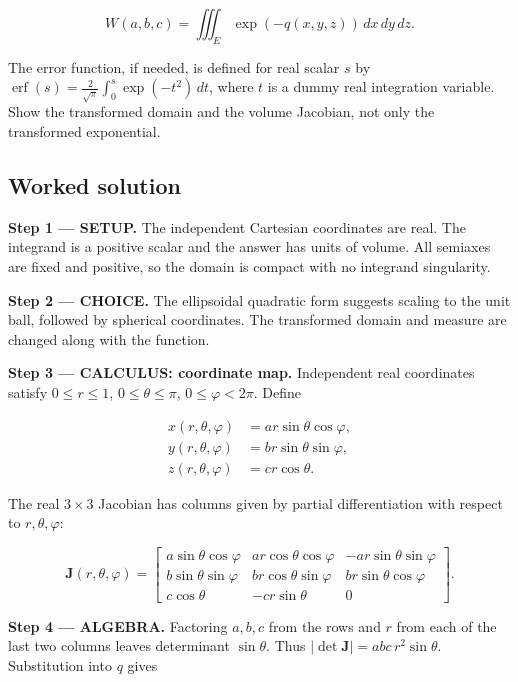 \documentclass[11pt,oneside,openany]{book}
\begin{document}
\[
W(a,b,c)=\iiint_E\exp(-q(x,y,z))\,dx\,dy\,dz.
\]

The error function, if needed, is defined for real scalar \(s\) by \(\operatorname{erf}(s)=\frac{2}{\sqrt\pi}\int_0^s\exp(-t^2)\,dt\), where \(t\) is a dummy real integration variable. Show the transformed domain and the volume Jacobian, not only the transformed exponential.
\subsection*{Worked solution}

\textbf{Step 1 --- SETUP.} The independent Cartesian coordinates are real. The integrand is a positive scalar and the answer has units of volume. All semiaxes are fixed and positive, so the domain is compact with no integrand singularity.

\begin{ChoiceStep}
\textbf{Step 2 --- CHOICE.} The ellipsoidal quadratic form suggests scaling to the unit ball, followed by spherical coordinates. The transformed domain and measure are changed along with the function.

\end{ChoiceStep}
\textbf{Step 3 --- CALCULUS: coordinate map.} Independent real coordinates satisfy \(0\le r\le1\), \(0\le\theta\le\pi\), \(0\le\varphi<2\pi\). Define

\[
\begin{aligned}
x(r,\theta,\varphi)&=ar\sin\theta\cos\varphi,\\
y(r,\theta,\varphi)&=br\sin\theta\sin\varphi,\\
z(r,\theta,\varphi)&=cr\cos\theta.
\end{aligned}
\]

The real \(3\times3\) Jacobian has columns given by partial differentiation with respect to \(r,\theta,\varphi\):

\[
\mathbf J(r,\theta,\varphi)=\begin{bmatrix}
a\sin\theta\cos\varphi&ar\cos\theta\cos\varphi&-ar\sin\theta\sin\varphi\\
b\sin\theta\sin\varphi&br\cos\theta\sin\varphi&br\sin\theta\cos\varphi\\
c\cos\theta&-cr\sin\theta&0
\end{bmatrix}.
\]

\begingroup\color{AlgebraBlue}
\textbf{Step 4 --- ALGEBRA.} Factoring \(a,b,c\) from the rows and \(r\) from each of the last two columns leaves determinant \(\sin\theta\). Thus \(|\det\mathbf J|=abc\,r^2\sin\theta\). Substitution into \(q\) gives
\end{document}
